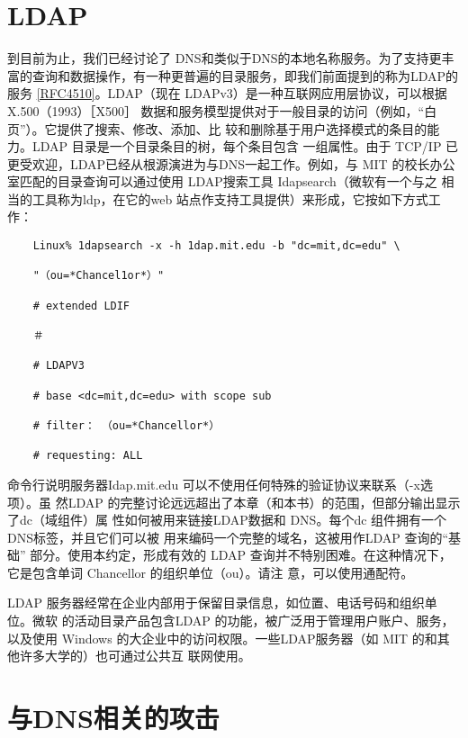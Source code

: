 \section{LDAP}

到目前为止，我们已经讨论了 DNS和类似于DNS的本地名称服务。为了支持更丰
富的查询和数据操作，有一种更普遍的目录服务，即我们前面提到的称为LDAP的服务
\href{https://www.rfc-editor.org/rfc/rfc4510}{[RFC4510]}。LDAP（现在 LDAPv3）是一种互联网应用层协议，可以根据 X.500（1993）［X500］
数据和服务模型提供对于一般目录的访问（例如，“白页”）。它提供了搜索、修改、添加、比
较和删除基于用户选择模式的条目的能力。LDAP 目录是一个目录条目的树，每个条目包含
一组属性。由于 TCP/IP 已更受欢迎，LDAP已经从根源演进为与DNS一起工作。例如，与
MIT 的校长办公室匹配的目录查询可以通过使用 LDAP搜索工具 Idapsearch（微软有一个与之
相当的工具称为ldp，在它的web 站点作支持工具提供）来形成，它按如下方式工作：

\begin{verbatim}
    Linux% 1dapsearch -x -h 1dap.mit.edu -b "dc=mit,dc=edu" \
    
    "（ou=*Chancel1or*）"
    
    # extended LDIF
    
    ＃
    
    # LDAPV3
    
    # base <dc=mit,dc=edu> with scope sub
    
    # filter： （ou=*Chancellor*）
    
    # requesting: ALL
\end{verbatim}

命令行说明服务器Idap.mit.edu 可以不使用任何特殊的验证协议来联系（-x选项）。虽
然LDAP 的完整讨论远远超出了本章（和本书）的范围，但部分输出显示了dc（域组件）属
性如何被用来链接LDAP数据和 DNS。每个dc 组件拥有一个 DNS标签，并且它们可以被
用来编码一个完整的域名，这被用作LDAP 查询的“基础” 部分。使用本约定，形成有效的
LDAP 查询并不特别困难。在这种情况下，它是包含单词 Chancellor 的组织单位（ou）。请注
意，可以使用通配符。

LDAP 服务器经常在企业内部用于保留目录信息，如位置、电话号码和组织单位。微软
的活动目录产品包含LDAP 的功能，被广泛用于管理用户账户、服务，以及使用 Windows
的大企业中的访问权限。一些LDAP服务器（如 MIT 的和其他许多大学的）也可通过公共互
联网使用。

\section{与DNS相关的攻击}

